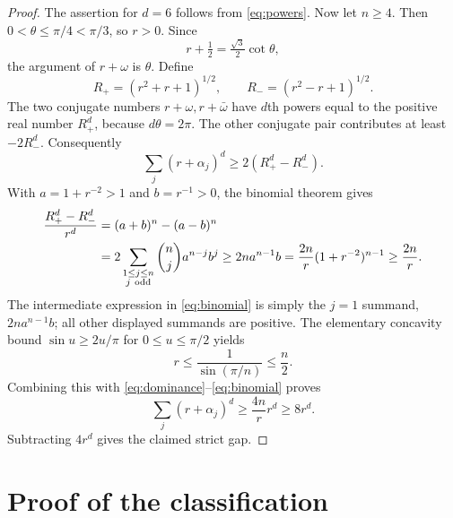 \documentclass[11pt,a4paper]{article}
\theoremstyle{remark}\newtheorem{remark}[theorem]{Remark}
\begin{document}
\begin{proof}
The assertion for $d=6$ follows from \eqref{eq:powers}. Now let $n\ge4$.
Then $0<\theta\le\pi/4<\pi/3$, so $r>0$. Since
\[
 r+\tfrac12=\tfrac{\sqrt3}{2}\cot\theta,
\]
the argument of $r+\omega$ is $\theta$. Define
\[
 R_+=(r^2+r+1)^{1/2},\qquad R_-=(r^2-r+1)^{1/2}.
\]
The two conjugate numbers $r+\omega,r+\bar\omega$ have $d$th powers
equal to the positive real number $R_+^d$, because $d\theta=2\pi$.
The other conjugate pair contributes at least $-2R_-^d$. Consequently
\begin{equation}\label{eq:dominance}
 \sum_j(r+\alpha_j)^d\ge2(R_+^d-R_-^d).
\end{equation}
With $a=1+r^{-2}>1$ and $b=r^{-1}>0$, the binomial theorem gives
\begin{align}
 \frac{R_+^d-R_-^d}{r^d}
  &=(a+b)^n-(a-b)^n \notag\\
  &=2\sum_{\substack{1\le j\le n\\j\ \mathrm{odd}}}
       \binom nj a^{n-j}b^j
   \ge 2na^{n-1}b
   =\frac{2n}{r}(1+r^{-2})^{n-1}
   \ge\frac{2n}{r}.\label{eq:binomial}
\end{align}
The intermediate expression in \eqref{eq:binomial} is simply the
$j=1$ summand, $2na^{n-1}b$; all other displayed summands are positive.
The elementary concavity bound $\sin u\ge2u/\pi$ for
$0\le u\le\pi/2$ yields
\[
 r\le\frac1{\sin(\pi/n)}\le\frac n2.
\]
Combining this with \eqref{eq:dominance}--\eqref{eq:binomial} proves
\[
 \sum_j(r+\alpha_j)^d\ge\frac{4n}{r}r^d\ge8r^d.
\]
Subtracting $4r^d$ gives the claimed strict gap.
\end{proof}

\section{Proof of the classification}
\end{document}
